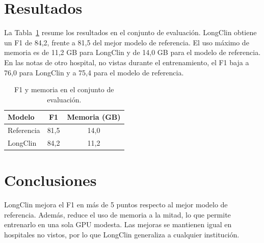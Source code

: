 \documentclass{article}
\begin{document}
\section{Resultados}
La Tabla~\ref{tab:res} resume los resultados en el conjunto de evaluación.
LongClin obtiene un F1 de 84,2, frente a 81,5 del mejor modelo de referencia.
El uso máximo de memoria es de 11,2 GB para LongClin y de 14,0 GB para el modelo de referencia.
En las notas de otro hospital, no vistas durante el entrenamiento, el F1 baja a 76,0 para LongClin y a 75,4 para el modelo de referencia.

\begin{table}[h]
\centering
\caption{F1 y memoria en el conjunto de evaluación.}
\label{tab:res}
\begin{tabular}{lcc}
\toprule
Modelo & F1 & Memoria (GB) \\
\midrule
Referencia & 81,5 & 14,0 \\
LongClin & 84,2 & 11,2 \\
\bottomrule
\end{tabular}
\end{table}

\section{Conclusiones}
LongClin mejora el F1 en más de 5 puntos respecto al mejor modelo de referencia.
Además, reduce el uso de memoria a la mitad, lo que permite entrenarlo en una sola GPU modesta.
Las mejoras se mantienen igual en hospitales no vistos, por lo que LongClin generaliza a cualquier institución.



\end{document}
